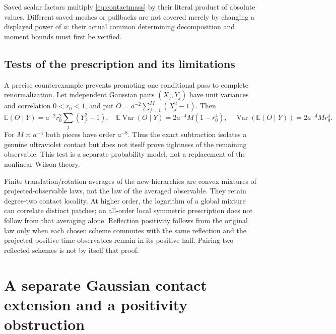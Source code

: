 \documentclass[11pt,letterpaper]{article}
\theoremstyle{plain}
\theoremstyle{remark}\newtheorem{remark}[theorem]{Scope}
\DeclareMathOperator{\Var}{Var}\DeclareMathOperator{\Cov}{Cov}
\newcommand{\E}{\mathbb E}\newcommand{\R}{\mathbb R}
\begin{document}
Saved scalar factors multiply \eqref{eq:contactmass} by their literal product of
absolute values. Different saved meshes or pullbacks are not covered merely by
changing a displayed power of $a$: their actual common determining decomposition
and moment bounds must first be verified.

\subsection{Tests of the prescription and its limitations}

A precise counterexample prevents promoting one conditional pass to complete
renormalization. Let independent Gaussian pairs $(X_j,Y_j)$ have unit variances
and correlation $0<r_0<1$, and put
$O=a^{-2}\sum_{j=1}^M(X_j^2-1)$. Then
\begin{equation}
\E(O\mid Y)=a^{-2}r_0^2\sum_j(Y_j^2-1),\quad
\E\Var(O\mid Y)=2a^{-4}M(1-r_0^4),\quad
\Var(\E(O\mid Y))=2a^{-4}Mr_0^4.
\label{eq:Gaussian-counterexample}
\end{equation}
For $M\asymp a^{-4}$ both pieces have order $a^{-8}$. Thus the exact subtraction
isolates a genuine ultraviolet contact but does not itself prove tightness of the
remaining observable. This test is a separate probability model, not a replacement
of the nonlinear Wilson theory.

Finite translation/rotation averages of the new hierarchies are convex mixtures
of projected-observable laws, not the law of the averaged observable. They retain
degree-two contact locality. At higher order, the logarithm of a global mixture
can correlate distinct patches; an all-order local symmetric prescription does
not follow from that averaging alone. Reflection positivity follows from the
original law only when each chosen scheme commutes with the same reflection and
the projected positive-time observables remain in its positive half. Pairing
two reflected schemes is not by itself that proof.

\section{A separate Gaussian contact extension and a positivity obstruction}
\label{sec:Gaussian}
\end{document}
